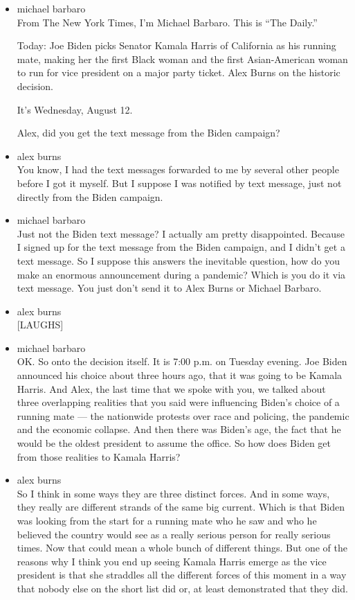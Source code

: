\begin{itemize}
\item
  michael barbaro\\
  From The New York Times, I'm Michael Barbaro. This is ``The Daily.''

  Today: Joe Biden picks Senator Kamala Harris of California as his
  running mate, making her the first Black woman and the first
  Asian-American woman to run for vice president on a major party
  ticket. Alex Burns on the historic decision.

  It's Wednesday, August 12.

  Alex, did you get the text message from the Biden campaign?
\item
  alex burns\\
  You know, I had the text messages forwarded to me by several other
  people before I got it myself. But I suppose I was notified by text
  message, just not directly from the Biden campaign.
\item
  michael barbaro\\
  Just not the Biden text message? I actually am pretty disappointed.
  Because I signed up for the text message from the Biden campaign, and
  I didn't get a text message. So I suppose this answers the inevitable
  question, how do you make an enormous announcement during a pandemic?
  Which is you do it via text message. You just don't send it to Alex
  Burns or Michael Barbaro.
\item
  alex burns\\
  {[}LAUGHS{]}
\item
  michael barbaro\\
  OK. So onto the decision itself. It is 7:00 p.m. on Tuesday evening.
  Joe Biden announced his choice about three hours ago, that it was
  going to be Kamala Harris. And Alex, the last time that we spoke with
  you, we talked about three overlapping realities that you said were
  influencing Biden's choice of a running mate --- the nationwide
  protests over race and policing, the pandemic and the economic
  collapse. And then there was Biden's age, the fact that he would be
  the oldest president to assume the office. So how does Biden get from
  those realities to Kamala Harris?
\item
  alex burns\\
  So I think in some ways they are three distinct forces. And in some
  ways, they really are different strands of the same big current. Which
  is that Biden was looking from the start for a running mate who he saw
  and who he believed the country would see as a really serious person
  for really serious times. Now that could mean a whole bunch of
  different things. But one of the reasons why I think you end up seeing
  Kamala Harris emerge as the vice president is that she straddles all
  the different forces of this moment in a way that nobody else on the
  short list did or, at least demonstrated that they did.


\end{itemize}
